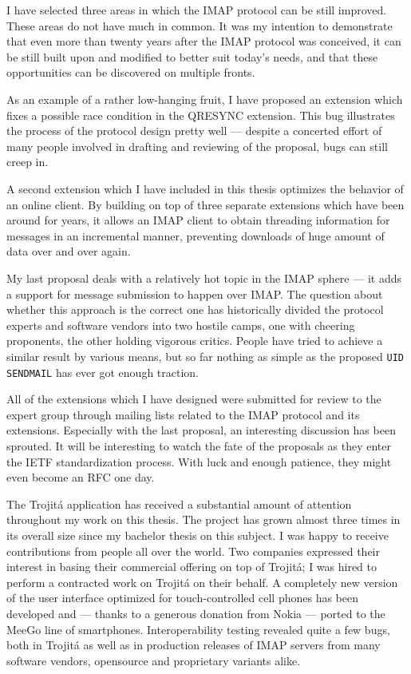 \documentclass[trojita]{subfiles}
\begin{document}
I have selected three areas in which the IMAP protocol can be still improved.  These areas do not have much in common.
It was my intention to demonstrate that even more than twenty years after the IMAP protocol was conceived, it can be
still built upon and modified to better suit today's needs, and that these opportunities can be discovered on multiple
fronts.

As an example of a rather low-hanging fruit, I have proposed an extension which fixes a possible race condition in the
QRESYNC extension.  This bug illustrates the process of the protocol design pretty well --- despite a concerted effort
of many people involved in drafting and reviewing of the proposal, bugs can still creep in.

A second extension which I have included in this thesis optimizes the behavior of an online client.  By building on top
of three separate extensions which have been around for years, it allows an IMAP client to obtain threading information
for messages in an incremental manner, preventing downloads of huge amount of data over and over again.

My last proposal deals with a relatively hot topic in the IMAP sphere --- it adds a support for message submission to
happen over IMAP.  The question about whether this approach is the correct one has historically divided the protocol
experts and software vendors into two hostile camps, one with cheering proponents, the other holding vigorous critics.
People have tried to achieve a similar result by various means, but so far nothing as simple as the proposed {\tt UID
SENDMAIL} has ever got enough traction.

All of the extensions which I have designed were submitted for review to the expert group through mailing lists related
to the IMAP protocol and its extensions.  Especially with the last proposal, an interesting discussion has been sprouted.
It will be interesting to watch the fate of the proposals as they enter the IETF standardization process.  With luck and
enough patience, they might even become an RFC one day.

The Trojitá application has received a substantial amount of attention throughout my work on this thesis.  The project
has grown almost three times in its overall size since my bachelor thesis on this subject.  I was happy to receive
contributions from people all over the world.  Two companies expressed their interest in basing their commercial
offering on top of Trojitá; I was hired to perform a contracted work on Trojitá on their behalf.  A completely new
version of the user interface optimized for touch-controlled cell phones has been developed and --- thanks to a generous
donation from Nokia --- ported to the MeeGo line of smartphones.  Interoperability testing revealed quite a few bugs,
both in Trojitá as well as in production releases of IMAP servers from many software vendors, opensource and proprietary
variants alike.
\end{document}
